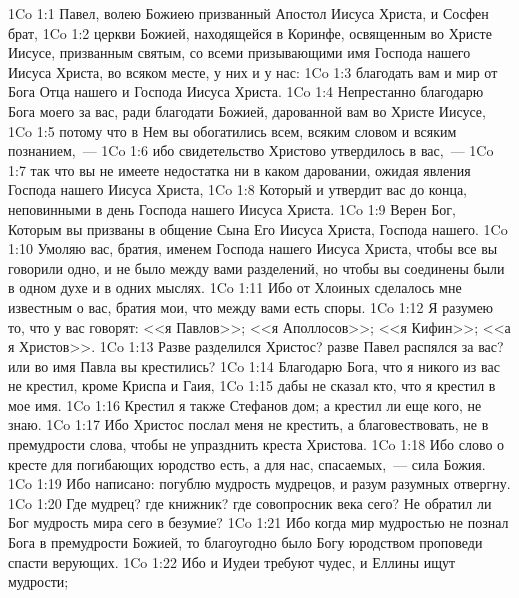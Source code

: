 \vs 1Co 1:1 Павел, волею Божиею призванный Апостол Иисуса Христа, и Сосфен брат,
\vs 1Co 1:2 церкви Божией, находящейся в Коринфе, освященным во Христе Иисусе, призванным святым, со всеми призывающими имя Господа нашего Иисуса Христа, во всяком месте, у них и у нас:
\vs 1Co 1:3 благодать вам и мир от Бога Отца нашего и Господа Иисуса Христа.
\rsbpar\vs 1Co 1:4 Непрестанно благодарю Бога моего за вас, ради благодати Божией, дарованной вам во Христе Иисусе,
\vs 1Co 1:5 потому что в Нем вы обогатились всем, всяким словом и всяким познанием,~---
\vs 1Co 1:6 ибо свидетельство Христово утвердилось в вас,~---
\vs 1Co 1:7 так что вы не имеете недостатка ни в каком даровании, ожидая явления Господа нашего Иисуса Христа,
\vs 1Co 1:8 Который и утвердит вас до конца,  неповинными в день Господа нашего Иисуса Христа.
\vs 1Co 1:9 Верен Бог, Которым вы призваны в общение Сына Его Иисуса Христа, Господа нашего.
\rsbpar\vs 1Co 1:10 Умоляю вас, братия, именем Господа нашего Иисуса Христа, чтобы все вы говорили одно, и не было между вами разделений, но чтобы вы соединены были в одном духе и в одних мыслях.
\vs 1Co 1:11 Ибо от  Хлоиных сделалось мне известным о вас, братия мои, что между вами есть споры.
\vs 1Co 1:12 Я разумею то, что у вас говорят: <<я Павлов>>; <<я Аполлосов>>; <<я Кифин>>; <<а я Христов>>.
\vs 1Co 1:13 Разве разделился Христос? разве Павел распялся за вас? или во имя Павла вы крестились?
\vs 1Co 1:14 Благодарю Бога, что я никого из вас не крестил, кроме Криспа и Гаия,
\vs 1Co 1:15 дабы не сказал кто, что я крестил в мое имя.
\vs 1Co 1:16 Крестил я также Стефанов дом; а крестил ли еще кого, не знаю.
\vs 1Co 1:17 Ибо Христос послал меня не крестить, а благовествовать, не в премудрости слова, чтобы не упразднить креста Христова.
\vs 1Co 1:18 Ибо слово о кресте для погибающих юродство есть, а для нас, спасаемых,~--- сила Божия.
\vs 1Co 1:19 Ибо написано: погублю мудрость мудрецов, и разум разумных отвергну.
\vs 1Co 1:20 Где мудрец? где книжник? где совопросник века сего? Не обратил ли Бог мудрость мира сего в безумие?
\vs 1Co 1:21 Ибо когда мир  мудростью не познал Бога в премудрости Божией, то благоугодно было Богу юродством проповеди спасти верующих.
\vs 1Co 1:22 Ибо и Иудеи требуют чудес, и Еллины ищут мудрости;
